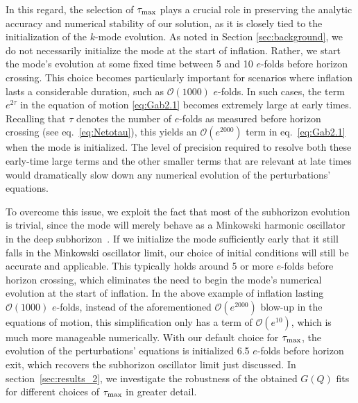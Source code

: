 \documentclass[a4paper,11pt]{article}
\begin{document}
In this regard, the selection of $\tau_{\rm{max}}$ plays a crucial role in preserving the analytic accuracy and numerical stability of our solution, as it is closely tied to the initialization of the $k$-mode evolution. As noted in Section \ref{sec:background}, we do not necessarily initialize the mode at the start of inflation. Rather, we start the mode's evolution at some fixed time between 5 and 10 $e$-folds before horizon crossing. This choice becomes particularly important for scenarios where inflation lasts a considerable duration, such as $\mathcal{O}(1000)$ $e$-folds. In such cases, the term $e^{2\tau}$ in the equation of motion \eqref{eq:Gab2.1} becomes extremely large at early times. Recalling that $\tau$ denotes the number of $e$-folds as measured before horizon crossing (see eq.~\eqref{eq:Netotau}), this yields an $\mathcal{O}(e^{2000})$ term in eq.~\eqref{eq:Gab2.1} when the mode is initialized. The level of precision required to resolve both these early-time large terms and the other smaller terms that are relevant at late times would dramatically slow down any numerical evolution of the perturbations' equations.

To overcome this issue, we exploit the fact that most of the subhorizon evolution is trivial, since the mode will merely behave as a Minkowski harmonic oscillator in the deep subhorizon~\cite{Weinberg:2008zzc}. If we initialize the mode sufficiently early that it still falls in the Minkowski oscillator limit, our choice of initial conditions will still be accurate and applicable. This typically holds around 5 or more $e$-folds before horizon crossing, which eliminates the need to begin the mode's numerical evolution at the start of inflation. In the above example of inflation lasting $\mathcal{O}(1000)$ $e$-folds, instead of the aforementioned $\mathcal{O}(e^{2000})$ blow-up in the equations of motion, this simplification only has a term of $\mathcal{O}(e^{10})$, which is much more manageable numerically.
With our default choice for $\tau_{\rm{max}}$, the evolution of the perturbations' equations is initialized 6.5 $e$-folds before horizon exit, which recovers the subhorizon oscillator limit just discussed. In section~\ref{sec:results_2}, we investigate the robustness of the obtained $G(Q)$ fits for different choices of $\tau_{\rm{max}}$ in greater detail.
\end{document}
